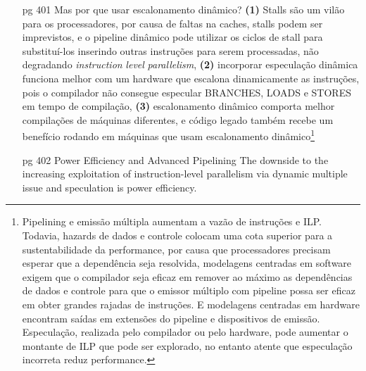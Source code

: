 \documentclass{article}
\begin{document}
\begin{enumerate}
\item[pg 401] Mas por que usar escalonamento dinâmico? \textbf{(1)} Stalls são
um vilão para os processadores, por causa de faltas na caches, stalls podem ser
imprevistos, e o pipeline dinâmico pode utilizar os ciclos de stall para
substituí-los inserindo outras instruções para serem processadas, não degradando
\textit{instruction} \textit{level} \textit{parallelism}, \textbf{(2)}
incorporar especulação dinâmica funciona melhor com um hardware que escalona
dinamicamente as instruções, pois o compilador não consegue especular BRANCHES,
LOADS e STORES em tempo de compilação, \textbf{(3)} escalonamento dinâmico
comporta melhor compilações de máquinas diferentes, e código legado também
recebe um benefício rodando em máquinas que usam escalonamento
dinâmico\footnote{Pipelining e emissão múltipla aumentam a vazão de instruções e
ILP. Todavia, hazards de dados e controle colocam uma cota superior para a 
sustentabilidade da performance, por causa que processadores precisam esperar 
que a dependência seja resolvida, modelagens centradas em software exigem que o 
compilador seja eficaz em remover ao máximo as dependências de dados e controle 
para que o emissor múltiplo com pipeline possa ser eficaz em obter grandes 
rajadas de instruções. E modelagens centradas em hardware encontram saídas em 
extensões do pipeline e dispositivos de emissão. Especulação, realizada pelo 
compilador ou pelo hardware, pode aumentar o montante de ILP que pode ser 
explorado, no entanto atente que especulação incorreta reduz performance.}

\item[pg 402] Power Efficiency and Advanced Pipelining The downside to the
increasing exploitation of instruction-level parallelism via dynamic multiple
issue and speculation is power efficiency.


\end{enumerate}
\end{document}
